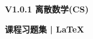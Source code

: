 \maketitle

\thispagestyle{empty}

\vspace{6.5cm}

\begin{center}
    \songti
    \textbf{V1.0.1 离散数学(CS)} 

    \textbf{课程习题集 | \LaTeX}
\end{center}

\newpage

\pagestyle{plain}
\setcounter{page}{1}
\tableofcontents
\newpage
\setcounter{page}{1}
